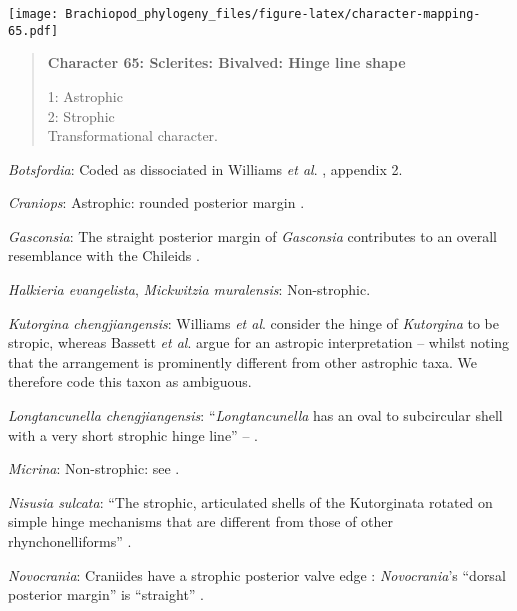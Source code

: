 \documentclass[openany]{book}
\theoremstyle{definition}
\theoremstyle{definition}
\theoremstyle{definition}
\theoremstyle{remark}
\begin{document}
\texttt{[image: Brachiopod\_phylogeny\_files/figure-latex/character-mapping-65.pdf]}

\begin{quote}
\textbf{Character 65: Sclerites: Bivalved: Hinge line shape}

1: Astrophic\\
2: Strophic\\
Transformational character.
\end{quote}

\hypertarget{Botsfordia-coding-65}{}
\emph{Botsfordia}: Coded as dissociated in Williams \emph{et al}.
\citeyearpar{Williams1998Thediversity}, appendix 2.

\hypertarget{Craniops-coding-65}{}
\emph{Craniops}: Astrophic: rounded posterior margin \citep[see fig. 91
in][]{Williams2000LinguliformeaCraniiformea}.

\hypertarget{Gasconsia-coding-65}{}
\emph{Gasconsia}: The straight posterior margin of \emph{Gasconsia}
contributes to an overall resemblance with the Chileids
\citep{Holmer2014Ordovician96}.

\hypertarget{Halkieria_evangelista-coding-65}{}
\emph{Halkieria evangelista}, \emph{Mickwitzia muralensis}:
Non-strophic.

\hypertarget{Kutorgina_chengjiangensis-coding-65}{}
\emph{Kutorgina chengjiangensis}: Williams \emph{et al}.
\citeyearpar[p.~208]{Williams2000LinguliformeaCraniiformea} consider the
hinge of \emph{Kutorgina} to be stropic, whereas Bassett \emph{et al}.
\citeyearpar{Bassett2001Functionalmorphology} argue for an astropic
interpretation -- whilst noting that the arrangement is prominently
different from other astrophic taxa. We therefore code this taxon as
ambiguous.

\hypertarget{Longtancunella_chengjiangensis-coding-65}{}
\emph{Longtancunella chengjiangensis}: ``\emph{Longtancunella} has an
oval to subcircular shell with a very short strophic hinge line'' --
\citet{Zhang2011Theexceptionally}.

\hypertarget{Micrina-coding-65}{}
\emph{Micrina}: Non-strophic: see \citet{Holmer2008TheEarly}.

\hypertarget{Nisusia_sulcata-coding-65}{}
\emph{Nisusia sulcata}: ``The strophic, articulated shells of the
Kutorginata rotated on simple hinge mechanisms that are different from
those of other rhynchonelliforms''
\citep[p.~208]{Williams2000LinguliformeaCraniiformea}.

\hypertarget{Novocrania-coding-65}{}
\emph{Novocrania}: Craniides have a strophic posterior valve edge
\citep[table 39 on p.~2853]{Williams2007Supplement}: \emph{Novocrania}'s
``dorsal posterior margin'' is ``straight''
\citep[p.~171]{Williams2000LinguliformeaCraniiformea}.
\end{document}
